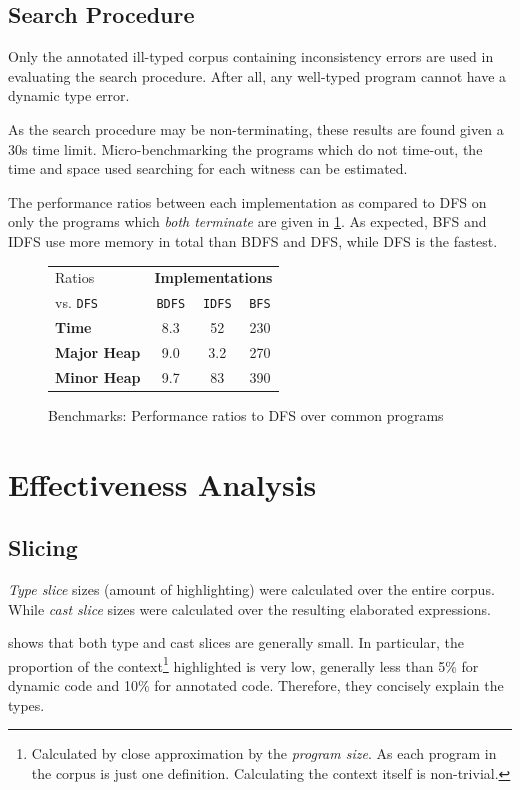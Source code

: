 \subsection{Search Procedure}
Only the annotated ill-typed corpus containing inconsistency errors are used in evaluating the search procedure. After all, any well-typed program cannot have a dynamic type error.

As the search procedure may be non-terminating, these results are found given a 30s time limit. Micro-benchmarking the programs which do not time-out, the time and space used searching for each witness can be estimated. 

The performance ratios between each implementation as compared to DFS on only the programs which \textit{both terminate} are given in \cref{fig:SearchPerformanceRatios}. As expected, BFS and IDFS use more memory in total than BDFS and DFS, while DFS is the fastest. 
\begin{figure}
  \centering
  \begin{tabular}{l|ccc}
  Ratios & \multicolumn{3}{c}{\textbf{Implementations}}\\
    vs. \texttt{DFS}& \texttt{BDFS} & \texttt{IDFS} & \texttt{BFS} \\
   \hline
   \textbf{Time} &  8.3 & 52 & 230\\
   \textbf{Major Heap} & 9.0 & 3.2 & 270\\
   \textbf{Minor Heap} & 9.7 & 83 & 390
  \end{tabular}
  
\caption{Benchmarks: Performance ratios to DFS over common programs}
\label{fig:SearchPerformanceRatios}
\end{figure}


\section{Effectiveness Analysis}\label{sec:EffectivenessAnalysis}


\subsection{Slicing}
\textit{Type slice} sizes (amount of highlighting) were calculated over the entire corpus. While \textit{cast slice} sizes were calculated over the resulting elaborated expressions.

 shows that both type and cast slices are generally small. In particular, the proportion of the context\footnote{Calculated by close approximation by the \textit{program size}. As each program in the corpus is just one definition. Calculating the context itself is non-trivial.} highlighted is very low, generally less than 5\% for dynamic code and 10\% for annotated code. Therefore, they concisely explain the types.

